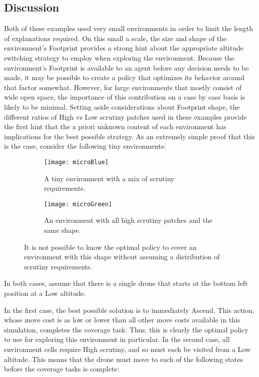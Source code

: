 \subsection{Discussion}

Both of these examples used very small environments in order to limit the length of explanations required. On this small a scale, the size and shape of the environment's Footprint provides a strong hint about the appropriate altitude switching strategy to employ when exploring the environment. Because the environment's Footprint is available to an agent before any decision needs to be made, it may be possible to create a policy that optimizes its behavior around that factor somewhat. However, for large environments that mostly consist of wide open space, the importance of this contribution on a case by case basis is likely to be minimal. Setting aside considerations about Footprint shape, the different ratios of High vs Low scrutiny patches used in these examples provide the first hint that the a priori unknown content of each environment has implications for the best possible strategy. As an extremely simple proof that this is the case, consider the following tiny environments:

\begin{figure}[H]
\begin{subfigure}{.5\textwidth}
  \centering
  \texttt{[image: microBlue]}
  \caption{A tiny environment with a mix of scrutiny requirements.}
\end{subfigure}
\begin{subfigure}{.5\textwidth}
  \centering
  \texttt{[image: microGreen]}
  \caption{An environment with all high scrutiny patches and the same shape.}
\end{subfigure}
\caption[Minimal Environments with Uncertain Policies]{It is not possible to know the optimal policy to cover an environment with this shape without assuming a distribution of scrutiny requirements.}
\end{figure}

In both cases, assume that there is a single drone that starts at the bottom left position at a Low altitude.

In the first case, the best possible solution is to immediately Ascend. This action, whose move cost is as low or lower than all other move costs available in this simulation, completes the coverage task. Thus, this is clearly the optimal policy to use for exploring this environment in particular. In the second case, all environment cells require High scrutiny, and so must each be visited from a Low altitude. This means that the drone must move to each of the following states before the coverage tasks is complete:


